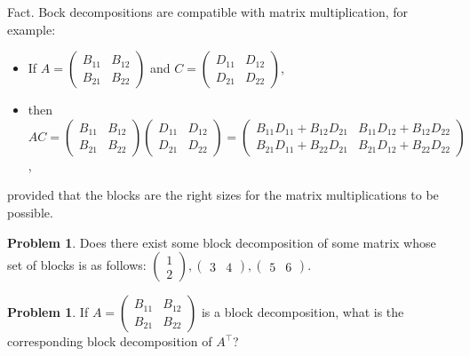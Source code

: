 \documentclass[10pt]{amsart}
\theoremstyle{mythm}
\theoremstyle{definition}
\newtheorem{prob}[thm]{Problem}
\theoremstyle{myrmk}
\begin{document}
	Fact. Bock decompositions are compatible with matrix multiplication, for example: 
	\begin{itemize}
		\item[] If $A = \begin{pmatrix}
		B_{11} & B_{12} \\ B_{21} & B_{22} 
		\end{pmatrix}$ and $C = \begin{pmatrix}
		D_{11} & D_{12} \\ D_{21} & D_{22}
		\end{pmatrix}$, 
		\item[] then $AC = \begin{pmatrix}
		B_{11} & B_{12} \\ B_{21} & B_{22} 
		\end{pmatrix}\begin{pmatrix}
		D_{11} & D_{12} \\ D_{21} & D_{22}
		\end{pmatrix} = \begin{pmatrix}
		B_{11}D_{11} + B_{12}D_{21} & B_{11}D_{12} + B_{12}D_{22} \\ B_{21}D_{11}+B_{22}D_{21} & B_{21}D_{12} + B_{22}D_{22}
		\end{pmatrix}$, 
	\end{itemize}
	provided that the blocks are the right sizes for the matrix multiplications to be possible. 
	\begin{prob}
		Does there exist some block decomposition of some matrix whose set of blocks is as follows: $\begin{pmatrix}
		1 \\2
		\end{pmatrix}, \begin{pmatrix}
		3 & 4
		\end{pmatrix}, \begin{pmatrix}
		5 & 6
		\end{pmatrix}$. 
	\end{prob}
	\begin{prob}
		If $A = \begin{pmatrix}
		B_{11} & B_{12} \\ B_{21} & B_{22} 
		\end{pmatrix}$ is a block decomposition, what is the corresponding block decomposition of $A^\top$? 
	\end{prob}
\end{document}
